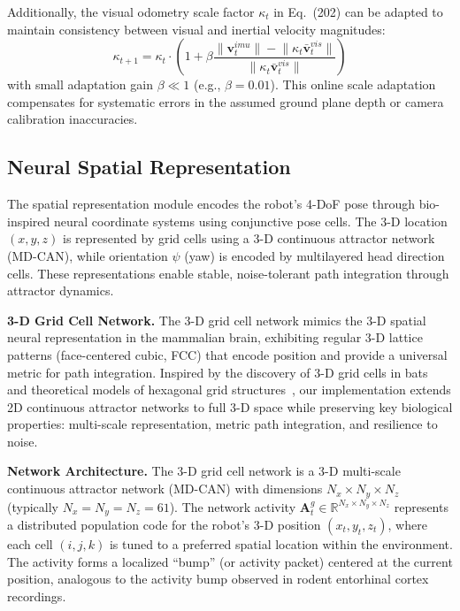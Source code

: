 Additionally, the visual odometry scale factor $\kappa_t$ in Eq.~(202) can be adapted to maintain consistency between visual and inertial velocity magnitudes:
\begin{equation}
    \kappa_{t+1} = \kappa_t \cdot \left(1 + \beta \frac{\lVert\mathbf{v}^{imu}_t\rVert - \lVert\kappa_t \bar{\mathbf{v}}^{vis}_t\rVert}{\lVert\kappa_t \bar{\mathbf{v}}^{vis}_t\rVert}\right)
\end{equation}
with small adaptation gain $\beta \ll 1$ (e.g., $\beta=0.01$). This online scale adaptation compensates for systematic errors in the assumed ground plane depth or camera calibration inaccuracies.

\subsection{Neural Spatial Representation}

The spatial representation module encodes the robot's 4-DoF pose through bio-inspired neural coordinate systems using conjunctive pose cells. The 3-D location $(x, y, z)$ is represented by grid cells using a 3-D continuous attractor network (MD-CAN), while orientation $\psi$ (yaw) is encoded by multilayered head direction cells. These representations enable stable, noise-tolerant path integration through attractor dynamics.

\textbf{3-D Grid Cell Network.} The 3-D grid cell network mimics the 3-D spatial neural representation in the mammalian brain, exhibiting regular 3-D lattice patterns (face-centered cubic, FCC) that encode position and provide a universal metric for path integration. Inspired by the discovery of 3-D grid cells in bats~\cite{finkelstein2016three} and theoretical models of hexagonal grid structures~\cite{hafting2005microstructure}, our implementation extends 2D continuous attractor networks to full 3-D space while preserving key biological properties: multi-scale representation, metric path integration, and resilience to noise.

\textbf{Network Architecture.} The 3-D grid cell network is a 3-D multi-scale continuous attractor network (MD-CAN) with dimensions $N_x \times N_y \times N_z$ (typically $N_x = N_y = N_z = 61$). The network activity $\mathbf{A}^{g}_t \in \mathbb{R}^{N_x \times N_y \times N_z}$ represents a distributed population code for the robot's 3-D position $(x_t, y_t, z_t)$, where each cell $(i,j,k)$ is tuned to a preferred spatial location within the environment. The activity forms a localized ``bump'' (or activity packet) centered at the current position, analogous to the activity bump observed in rodent entorhinal cortex recordings.

